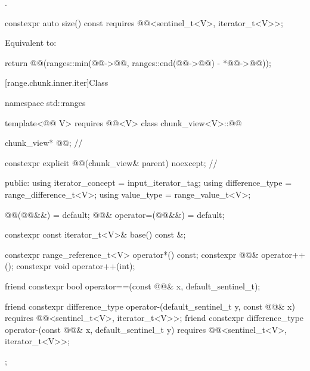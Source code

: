 \begin{itemdescr}
\pnum
\returns
{}.
\end{itemdescr}

\begin{itemdecl}
constexpr auto size() const
  requires @@<sentinel_t<V>, iterator_t<V>>;
\end{itemdecl}

\begin{itemdescr}
\pnum
\effects
Equivalent to:
\begin{codeblock}
return @@(ranges::min(@@->@@,
	                            ranges::end(@@->@@) - *@@->@@));
\end{codeblock}
\end{itemdescr}

[range.chunk.inner.iter]{Class }

%
\begin{codeblock}
namespace std::ranges {
  template<@@ V>
    requires @@<V>
  class chunk_view<V>::@@ {
    chunk_view* @@;                                                // \expos

    constexpr explicit @@(chunk_view& parent) noexcept;     // \expos

  public:
    using iterator_concept = input_iterator_tag;
    using difference_type = range_difference_t<V>;
    using value_type = range_value_t<V>;

    @@(@@&&) = default;
    @@& operator=(@@&&) = default;

    constexpr const iterator_t<V>& base() const &;

    constexpr range_reference_t<V> operator*() const;
    constexpr @@& operator++();
    constexpr void operator++(int);

    friend constexpr bool operator==(const @@& x, default_sentinel_t);

    friend constexpr difference_type operator-(default_sentinel_t y, const @@& x)
      requires @@<sentinel_t<V>, iterator_t<V>>;
    friend constexpr difference_type operator-(const @@& x, default_sentinel_t y)
      requires @@<sentinel_t<V>, iterator_t<V>>;
  };
}
\end{codeblock}

